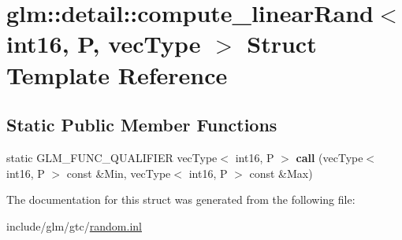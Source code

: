 \hypertarget{structglm_1_1detail_1_1compute__linearRand_3_01int16_00_01P_00_01vecType_01_4}{}\section{glm\+:\+:detail\+:\+:compute\+\_\+linear\+Rand$<$ int16, P, vec\+Type $>$ Struct Template Reference}
\label{structglm_1_1detail_1_1compute__linearRand_3_01int16_00_01P_00_01vecType_01_4}
\subsection*{Static Public Member Functions}
\begin{DoxyCompactItemize}
\item 
\mbox{\label{structglm_1_1detail_1_1compute__linearRand_3_01int16_00_01P_00_01vecType_01_4_a2cf2a727838709537e66cef0fe48b236}} 
static G\+L\+M\+\_\+\+F\+U\+N\+C\+\_\+\+Q\+U\+A\+L\+I\+F\+I\+ER vec\+Type$<$ int16, P $>$ {\bfseries call} (vec\+Type$<$ int16, P $>$ const \&Min, vec\+Type$<$ int16, P $>$ const \&Max)
\end{DoxyCompactItemize}


The documentation for this struct was generated from the following file\+:\begin{DoxyCompactItemize}
\item 
include/glm/gtc/\hyperlink{random_8inl}{random.\+inl}\end{DoxyCompactItemize}
